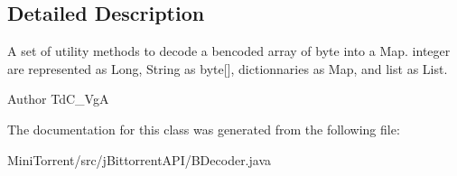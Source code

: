 \subsection{Detailed Description}
A set of utility methods to decode a bencoded array of byte into a Map. integer are represented as Long, String as byte\mbox{[}\mbox{]}, dictionnaries as Map, and list as List.

\begin{DoxyAuthor}{Author}
TdC\_\-VgA 
\end{DoxyAuthor}


The documentation for this class was generated from the following file:\begin{DoxyCompactItemize}
\item 
MiniTorrent/src/jBittorrentAPI/BDecoder.java\end{DoxyCompactItemize}
